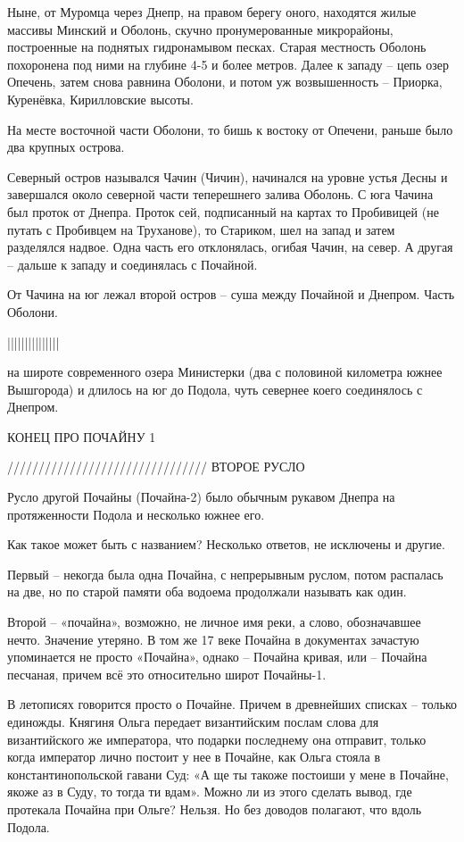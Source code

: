 Ныне, от Муромца через Днепр, на правом берегу оного, находятся жилые массивы Минский и Оболонь, скучно пронумерованные микрорайоны, построенные на поднятых гидронамывом песках.  Старая местность Оболонь похоронена под ними на глубине 4-5 и более метров. Далее к западу – цепь озер Опечень, затем снова равнина Оболони, и потом уж возвышенность – Приорка, Куренёвка, Кирилловские высоты.

На месте восточной части Оболони, то бишь к востоку от Опечени, раньше было два крупных острова.

Северный остров назывался Чачин (Чичин), начинался на уровне устья Десны и завершался около северной части теперешнего залива Оболонь. С юга Чачина был проток от Днепра. Проток сей, подписанный на картах то Пробивицей (не путать с Пробивцем на Труханове), то Стариком, шел на запад и затем разделялся надвое. Одна часть его отклонялась, огибая Чачин, на север. А другая – дальше к западу и соединялась с Почайной.

От Чачина на юг лежал второй остров – суша между Почайной и Днепром. Часть Оболони.


|||||||||||||||


на широте современного озера Министерки (два с половиной километра южнее Вышгорода) и длилось на юг до Подола, чуть севернее коего соединялось с Днепром. 

КОНЕЦ ПРО ПОЧАЙНУ 1

////////////////////////////////
ВТОРОЕ РУСЛО


Русло другой Почайны (Почайна-2) было обычным рукавом Днепра на протяженности Подола и несколько южнее его.

Как такое может быть с названием? Несколько ответов, не исключены и другие.

Первый – некогда была одна Почайна, с непрерывным руслом, потом распалась на две, но по старой памяти оба водоема продолжали называть как один.

Второй – «почайна», возможно, не личное имя реки, а слово, обозначавшее нечто. Значение утеряно. В том же 17 веке Почайна в документах зачастую упоминается не просто «Почайна», однако – Почайна кривая, или – Почайна песчаная, причем всё это относительно широт Почайны-1.

В летописях говорится просто о Почайне. Причем в древнейших списках – только единожды. Княгиня Ольга передает византийским послам слова для византийского же императора, что подарки последнему она отправит, только когда император лично постоит у нее в Почайне, как Ольга стояла в константинопольской гавани Суд: «А ще ты такоже постоиши у мене в Почайне, якоже аз в Суду, то тогда ти вдам». Можно ли из этого сделать вывод, где протекала Почайна при Ольге? Нельзя. Но без доводов полагают, что вдоль Подола.

